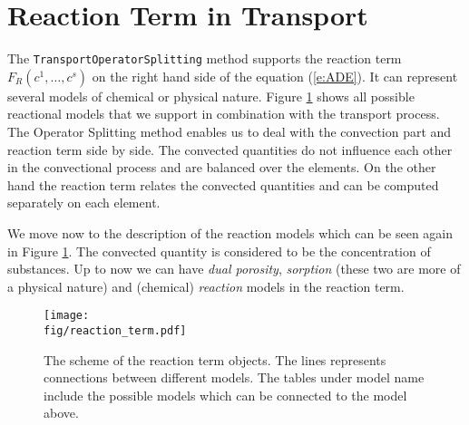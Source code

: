 \def\abs#1{\lvert#1\rvert}
\def\argdot{{\hspace{0.18em}\cdot\hspace{0.18em}}}
\def\avg#1{\left\{#1\right\}_\omega}
\def\D{{\tn D}}
\def\div{\operatorname{div}}
\def\Eh{\mathcal E_h}       %
\def\Ehcom{\mathcal E_{h,C}}         %
\def\Ehdir{\mathcal E_{h,D}}         %
\def\Ehint{\mathcal E_{h,I}}       %
\def\grad{\nabla}
\def\jmp#1{[#1]}
\def\n{\vc n}
\def\vc#1{\mathbf{\boldsymbol{#1}}}     %
\def\R{\mathbb R}
\def\sc#1#2{\left(#1,#2\right)}
\def\Th{\mathcal T_h}       %
\def\th{\vartheta}
\def\tn#1{{\mathbb{#1}}}    %
\def\Tr{\operatorname{Tr}}
\def\where{\,|\,}

\section{Reaction Term in Transport}
\label{sec:reaction_term}

The {\tt TransportOperatorSplitting} method supports the reaction term $F_R(c^1,\ldots,c^s)$ on the right hand side of the equation (\ref{e:ADE}).
It can represent several models of chemical or physical nature. 
Figure \ref{fig:reaction_term} shows all possible reactional models that we support in combination with the transport process. The Operator Splitting method enables 
us to deal with the convection part and reaction term side by side. The convected quantities do not influence each other in the convectional
process and are balanced over the elements. On the other hand the reaction term relates the convected quantities and can be computed 
separately on each element.

We move now to the description of the reaction models which can be seen again in Figure \ref{fig:reaction_term}. 
The convected quantity is considered to be the concentration of substances. 
Up to now we can have \emph{dual porosity}, \emph{sorption} (these two are more of a physical nature) and (chemical) \emph{reaction} models in the reaction term. 

\begin{figure}
  \centering
  \texttt{[image: \\fig/reaction\_term.pdf]}
  \caption{The scheme of the reaction term objects. The lines represents connections between different models. 
  The tables under model name include the possible models which can be connected to the model above.}
  \label{fig:reaction_term}
\end{figure}

